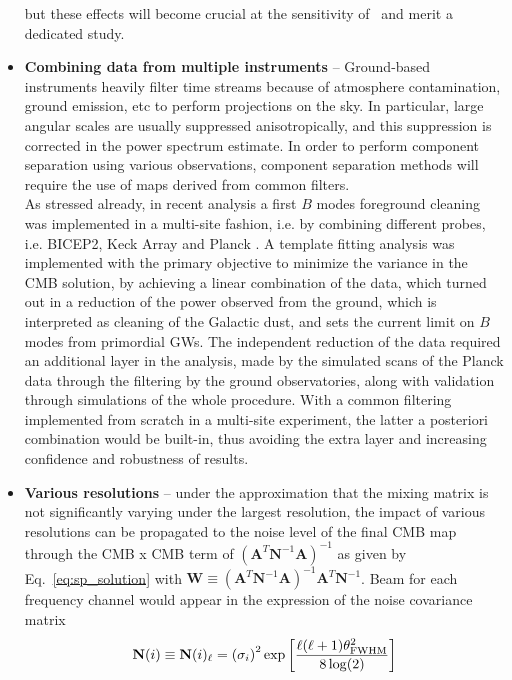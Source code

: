 \begin{itemize}
but these effects will become crucial at the sensitivity of \cmbexp\ and merit a dedicated study.
	\item \textbf{Combining data from multiple instruments} -- Ground-based instruments heavily filter time streams because of atmosphere contamination, ground emission, etc to perform projections on the sky. In particular, large angular scales are usually suppressed anisotropically, and this suppression is corrected in the power spectrum estimate. In order to perform component separation using various observations, component separation methods will require the use of maps derived from common filters. \\
	As stressed already, in recent analysis a first $B$ modes foreground cleaning was implemented in a multi-site fashion, i.e. by combining different probes, i.e. BICEP2, Keck Array and Planck \cite{bicepkeckplanck15}. A template fitting analysis was implemented with the primary objective to minimize the variance in the CMB solution, by achieving a linear combination of the data, which turned out in a reduction of the power observed from the ground, which is interpreted as cleaning of the Galactic dust, and sets the current limit on $B$ modes from primordial GWs. The independent reduction of the data required an additional layer in the analysis, made by the simulated scans of the Planck data through the filtering by the ground observatories, along with validation through simulations of the whole procedure. With a common filtering implemented from scratch in a multi-site experiment, the latter a posteriori combination would be built-in, thus avoiding the extra layer and increasing confidence and robustness of results.
	\item \textbf{Various resolutions} -- under the approximation that the mixing matrix is not significantly varying under the largest resolution, the impact of various resolutions can be propagated to the noise level of the final CMB map through the CMB x CMB term of $\left(\mathbf{A}^T\mathbf{N}^{-1}\mathbf{A}\right)^{-1}$ as given by Eq.~\ref{eq:sp_solution} with $\mathbf{W} \equiv \left( \mathbf{A}^T\mathbf{N}^{-1}\mathbf{A} \right)^{-1}\mathbf{A}^T\mathbf{N}^{-1}$. Beam for each frequency channel would appear in the expression of the noise covariance matrix 
	\begin{eqnarray}
		\centering
			\mathbf{N}(i) \equiv \mathbf{N}(i)_\ell = \left( \sigma_i\right)^2\exp\left[ \frac{\ell(\ell+1)\theta_{\rm FWHM}^2}{8\log(2)} \right]

\end{eqnarray}
\end{itemize}
